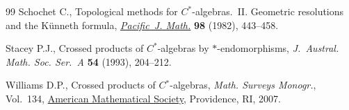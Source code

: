 \documentclass[10pt,a4paper]{amsart}
\numberwithin{equation}{section}
\begin{document}
\begin{thebibliography}{99}
Schochet C., Topological methods for {$C^{\ast} $}-algebras.~{II}. {G}eometric
 resolutions and the {K}\"unneth formula,
 \href{https://doi.org/10.2140/pjm.1982.98.443}{\textit{Pacific~J. Math.}}
 \textbf{98} (1982), 443--458.

Stacey P.J., Crossed products of {$C^\ast$}-algebras by {$\ast$}-endomorphisms,
 \textit{J.~Austral. Math. Soc. Ser.~A} \textbf{54} (1993), 204--212.

Williams D.P., Crossed products of {$C{^\ast}$}-algebras, \textit{Math. Surveys Monogr.}, Vol.~134,
 \href{https://doi.org/10.1090/surv/134}{American Mathematical Society},
 Providence, RI, 2007.

\end{thebibliography}
\end{document}
